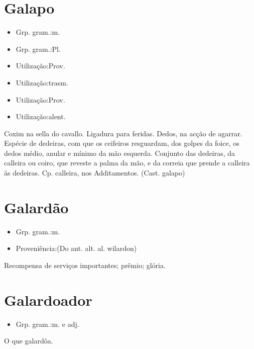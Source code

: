 \section{Galapo}
\begin{itemize}
\item {Grp. gram.:m.}
\end{itemize}
\begin{itemize}
\item {Grp. gram.:Pl.}
\end{itemize}
\begin{itemize}
\item {Utilização:Prov.}
\end{itemize}
\begin{itemize}
\item {Utilização:trasm.}
\end{itemize}
\begin{itemize}
\item {Utilização:Prov.}
\end{itemize}
\begin{itemize}
\item {Utilização:alent.}
\end{itemize}
Coxim na sella do cavallo.
Ligadura para feridas.
Dedos, na acção de agarrar.
Espécie de dedeiras, com que os ceifeiros resguardam, dos golpes da foice, os dedos médio, anular e mínimo da mão esquerda.
Conjunto das dedeiras, da calleira ou coiro, que reveste a palma da mão, e da correia que prende a calleira ás dedeiras. Cp. \textunderscore calleira\textunderscore , nos \textunderscore Additamentos\textunderscore .
(Cast. \textunderscore galapo\textunderscore )
\section{Galardão}
\begin{itemize}
\item {Grp. gram.:m.}
\end{itemize}
\begin{itemize}
\item {Proveniência:(Do ant. alt. al. \textunderscore wilardon\textunderscore )}
\end{itemize}
Recompensa de serviços importantes; prêmio; glória.
\section{Galardoador}
\begin{itemize}
\item {Grp. gram.:m.  e  adj.}
\end{itemize}
O que galardôa.

